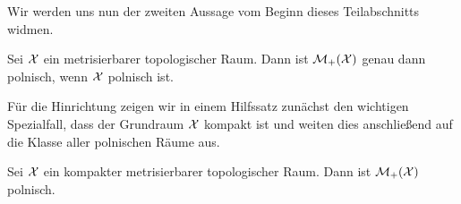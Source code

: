 \documentclass[../main/main.tex]{subfiles}
\begin{document}
	Wir werden uns nun der zweiten Aussage vom Beginn dieses Teilabschnitts widmen. 
	
	\begin{Satz}
		\label{satz:übertragung_polnizität}
		Sei $\mathcal{X}$ ein metrisierbarer topologischer Raum. Dann ist $\mathcal{M}_{+}(\mathcal{X})$ genau dann polnisch, wenn $\mathcal{X}$ polnisch ist.
	\end{Satz}
	
	Für die Hinrichtung zeigen wir in einem Hilfssatz zunächst den wichtigen Spezialfall, dass der Grundraum $\mathcal{X}$ kompakt ist und weiten dies anschließend auf die Klasse aller polnischen Räume aus.

	\begin{Hilfssatz}
		\label{hilfssatz:übertragung_polnizität_kompakter_grundraum}
		Sei $\mathcal{X}$ ein kompakter metrisierbarer topologischer Raum. Dann ist $\mathcal{M}_{+}(\mathcal{X})$ polnisch.
	\end{Hilfssatz}
	
\end{document}
